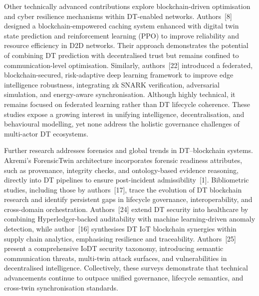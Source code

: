 \documentclass[11pt]{article}
\begin{document}
Other technically advanced contributions explore blockchain-driven optimisation and cyber resilience mechanisms within DT-enabled networks. Authors~[8] designed a blockchain-empowered caching system enhanced with digital twin state prediction and reinforcement learning (PPO) to improve reliability and resource efficiency in D2D networks. Their approach demonstrates the potential of combining DT prediction with decentralised trust but remains confined to communication-level optimisation. Similarly, authors~[22] introduced a federated, blockchain-secured, risk-adaptive deep learning framework to improve edge intelligence robustness, integrating zk SNARK verification, adversarial simulation, and energy-aware synchronisation. Although highly technical, it remains focused on federated learning rather than DT lifecycle coherence. These studies expose a growing interest in unifying intelligence, decentralisation, and behavioural modelling, yet none address the holistic governance challenges of multi-actor DT ecosystems.

Further research addresses forensics and global trends in DT–blockchain systems. Akremi’s ForensicTwin architecture incorporates forensic readiness attributes, such as provenance, integrity checks, and ontology-based evidence reasoning, directly into DT pipelines to ensure post-incident admissibility~[1]. Bibliometric studies, including those by authors~[17], trace the evolution of DT blockchain research and identify persistent gaps in lifecycle governance, interoperability, and cross-domain orchestration. Authors~[24] extend DT security into healthcare by combining Hyperledger-backed auditability with machine learning-driven anomaly detection, while author~[16] synthesises DT IoT blockchain synergies within supply chain analytics, emphasising resilience and traceability. Authors~[25] present a comprehensive IoDT security taxonomy, introducing semantic communication threats, multi-twin attack surfaces, and vulnerabilities in decentralised intelligence. Collectively, these surveys demonstrate that technical advancements continue to outpace unified governance, lifecycle semantics, and cross-twin synchronisation standards.
\end{document}
